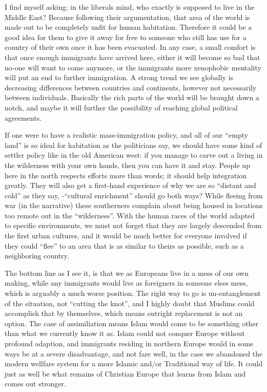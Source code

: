 \begin{footnotesize}
\begin{sffamily}
I find myself asking; in the liberals mind, who exactly is supposed to live in the Middle East? Because following their argumentation, that area of the world is made out to be completely unfit for human habitation. Therefore it could be a good idea for them to give it away for free to someone who still has use for a country of their own once it has been evacuated. In any case, a small comfort is that once enough immigrants have arrived here, either it will become so bad that no-one will want to come anymore, or the immigrants more xenophobic mentality will put an end to further immigration. A strong trend we see globally is decreasing differences between countries and continents, however not necessarily between individuals. Basically the rich parts of the world will be brought down a notch, and maybe it will further the possibility of reaching global political agreements.

If one were to have a realistic mass-immigration policy, and all of our ``empty land'' is so ideal for habitation as the politicians say, we should have some kind of settler policy like in the old American west: if you manage to carve out a living in the wilderness with your own hands, then you can have it and stay. People up here in the north respects efforts more than words; it should help integration greatly. They will also get a first-hand experience of why we are so ``distant and cold'' as they say, -``cultural enrichment'' should go both ways? While fleeing from war (in the narrative) these southerners complain about being housed in locations too remote out in the ``wilderness''. With the human races of the world adapted to specific environments, we must not forget that they are largely descended from the first urban cultures, and it would be much better for everyone involved if they could ``flee'' to an area that is as similar to theirs as possible, such as a neighboring country.

The bottom line as I see it, is that we as Europeans live in a mess of our own making, while any immigrants would live as foreigners in someone elses mess, which is arguably a much worse position. The right way to go is un-entanglement of the situation, not ``cutting the knot'', and I highly doubt that Muslims could accomplish that by themselves, which means outright replacement is not an option. The case of assimiliation means Islam would come to be something other than what we currently know it as. Islam could not conquer Europe without profound adaption, and immigrants residing in northern Europe would in some ways be at a severe disadvantage, and not fare well, in the case we abandoned the modern wellfare system for a more Islamic and/or Traditional way of life. It could just as well be what remains of Christian Europe that learns from Islam and comes out stronger.


\end{sffamily}
\end{footnotesize}
